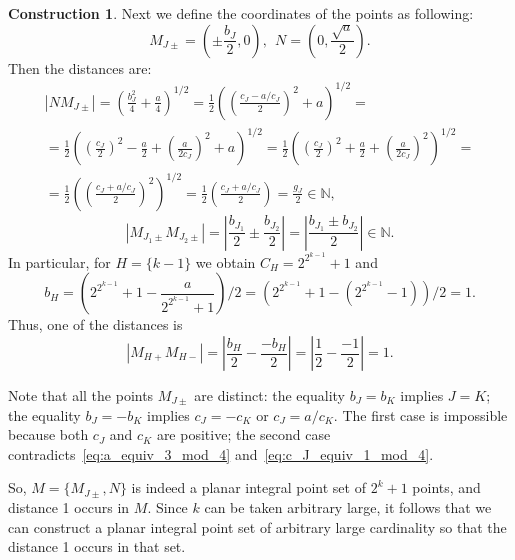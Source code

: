 \documentclass[a4paper,14pt]{article} %
\theoremstyle{plain}
\theoremstyle{definition}
\newtheorem{construction}[theorem]{Construction}
\begin{document}
\begin{construction}
	Next we define the coordinates of the points as following:
	\begin{equation}
		M_{J\pm} =\left(\pm\frac{b_J}{2}, 0\right)
		,
		~~
		N   =\left(0, \frac{\sqrt{a}}{2}\right)
		.
	\end{equation}
	Then the distances are:
	\begin{multline}
		|N M_{J\pm}|
		=
		\left(\frac{b_J^2}{4} + \frac{a}{4}\right)^{1/2}
		=
		\frac{1}{2}\left(\left(\frac{c_J - a/c_J}{2}\right)^2 + a\right)^{1/2}
		=
		\\=
		\frac{1}{2}\left( \left(\frac{c_J}{2}\right)^2 - \frac{a}{2} + \left(\frac{a}{2c_J}\right)^2 + a\right)^{1/2}
		=
		\frac{1}{2}\left( \left(\frac{c_J}{2}\right)^2 + \frac{a}{2} + \left(\frac{a}{2c_J}\right)^2    \right)^{1/2}
		=
		\\=
		\frac{1}{2}\left(\left(\frac{c_J + a/c_J}{2}\right)^2\right)^{1/2}
		=
		\frac{1}{2}\left(\frac{c_J + a/c_J}{2}\right)
		=
		\frac{g_J}{2}
		\in\mathbb{N}
		,
	\end{multline}
	\begin{equation}
		|M_{J_1 \pm}  M_{J_2 \pm}|
		=
		\left|\frac{b_{J_1}}{2} \pm \frac{b_{J_2}}{2}\right|
		=
		\left|\frac{b_{J_1} \pm b_{J_2}}{2}\right|
		\in\mathbb{N}
		.
	\end{equation}
	In particular, for $H = \{k-1\}$ we obtain $C_H = 2^{2^{k-1}}+1$ and
	\begin{equation}
		b_H =
		\left( 2^{2^{k-1}}+1 - \frac{a}{2^{2^{k-1}}+1} \right)/2
		=
		\left(2^{2^{k-1}}+1 - \left(  2^{2^{k-1}}-1 \right) \right)/2
		=
		1
		.
	\end{equation}
	Thus, one of the distances is
	\begin{equation}
		|M_{H+}  M_{H-}|
		=
		\left|\frac{b_{H}}{2} - \frac{-b_{H}}{2}\right|
		=
		\left|\frac{1}{2} - \frac{-1}{2}\right|
		= 1
		.
	\end{equation}

	Note that all the points $M_{J\pm}$ are distinct:
	the equality $b_J =  b_K$ implies $J=K$;
	the equality $b_J = -b_K$ implies $c_J = -c_K$ or $c_J = a / c_K$.
	The first case is impossible because both $c_J$ and $c_K$ are positive;
	the second case contradicts~\eqref{eq:a_equiv_3_mod_4} and~\eqref{eq:c_J_equiv_1_mod_4}.


	So, $M = \{ M_{J\pm}, N\}$ is indeed a planar integral point set of $2^k+1$ points,
	and distance 1 occurs in $M$.
	Since $k$ can be taken arbitrary large, it follows that we can construct
	a planar integral point set of arbitrary large cardinality so that the distance 1 occurs in that set.
\end{construction}
\end{document}
